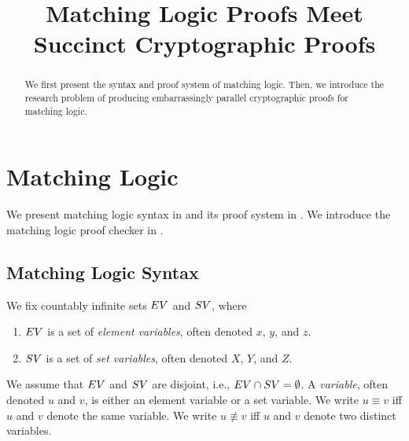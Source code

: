 \documentclass{article}
\title{Matching Logic Proofs Meet Succinct Cryptographic Proofs}
\author{}
\date{}
\begin{document}
\maketitle

\begin{abstract}
We first present the syntax and proof system of matching logic.
Then, we introduce the research problem of producing embarrassingly parallel 
cryptographic proofs for matching logic. 
\end{abstract}

\section{Matching Logic}

We present matching logic syntax in 
and its proof system in . 
We introduce the matching logic proof checker in . 

\subsection{Matching Logic Syntax}
\label{sec:ml_syntax}

We fix countably infinite sets $EV$ and $SV$, where
\begin{enumerate}
\item $EV$ is a set of \emph{element variables},
      often denoted $x$, $y$, and $z$. 
\item $SV$ is a set of \emph{set variables},
      often denoted $X$, $Y$, and $Z$.
\end{enumerate}
We assume that $EV$ and $SV$ are disjoint, i.e., $EV \cap SV = \emptyset$. 
A \emph{variable}, often denoted $u$ and $v$,
is either an element variable or a set variable.
We write $u \equiv v$ iff $u$ and $v$ denote the same variable.
We write $u \not\equiv v$ iff $u$ and $v$ denote two distinct variables. 
\end{document}
